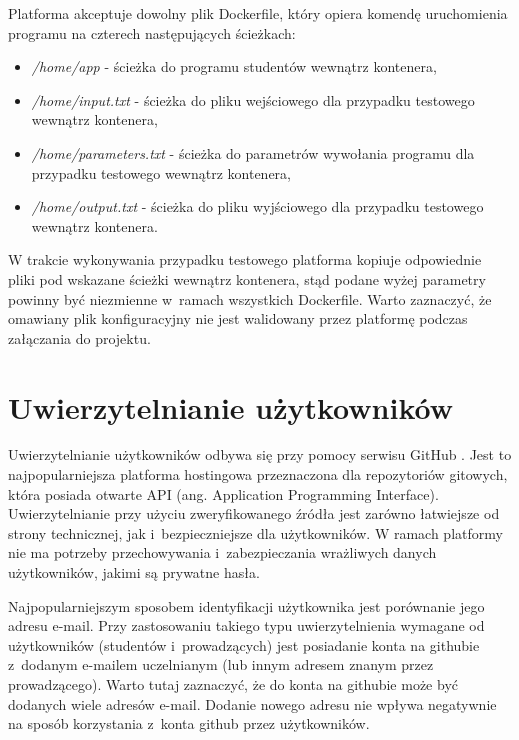 Platforma akceptuje dowolny plik Dockerfile, który opiera komendę uruchomienia programu na czterech następujących ścieżkach:
\begin{itemize}
    \item \textit{/home/app} - ścieżka do programu studentów wewnątrz kontenera,
    \item \textit{/home/input.txt} - ścieżka do pliku wejściowego dla przypadku testowego wewnątrz kontenera,
    \item \textit{/home/parameters.txt} - ścieżka do parametrów wywołania programu dla przypadku testowego wewnątrz kontenera,
    \item \textit{/home/output.txt} - ścieżka do pliku wyjściowego dla przypadku testowego wewnątrz kontenera.
\end{itemize}

W trakcie wykonywania przypadku testowego platforma kopiuje odpowiednie pliki pod wskazane ścieżki wewnątrz kontenera, stąd podane wyżej parametry powinny być niezmienne w~ramach wszystkich Dockerfile.
Warto zaznaczyć, że omawiany plik konfiguracyjny nie jest walidowany przez platformę podczas załączania do projektu.


\section {Uwierzytelnianie użytkowników}
\label{authorization}

Uwierzytelnianie użytkowników odbywa się przy pomocy serwisu GitHub \cite{gitHub}.
Jest to najpopularniejsza platforma hostingowa przeznaczona dla repozytoriów gitowych, która posiada otwarte API (ang. Application Programming Interface).
Uwierzytelnianie przy użyciu zweryfikowanego źródła jest zarówno łatwiejsze od strony technicznej, jak i~bezpieczniejsze dla użytkowników.
W ramach platformy nie ma potrzeby przechowywania i~zabezpieczania wrażliwych danych użytkowników, jakimi są prywatne hasła.

Najpopularniejszym sposobem identyfikacji użytkownika jest porównanie jego adresu e-mail.
Przy zastosowaniu takiego typu uwierzytelnienia wymagane od użytkowników (studentów i~prowadzących) jest posiadanie konta na githubie z~dodanym e-mailem uczelnianym (lub innym adresem znanym przez prowadzącego).
Warto tutaj zaznaczyć, że do konta na githubie może być dodanych wiele adresów e-mail.
Dodanie nowego adresu nie wpływa negatywnie na sposób korzystania z~konta github przez użytkowników.

